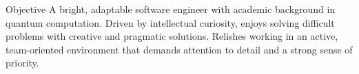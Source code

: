 \documentclass{resume} %
\begin{document}
%
\begin{rSection}{Objective}
A bright, adaptable software engineer with academic background in quantum computation. Driven by intellectual curiosity, enjoys solving difficult problems with creative and pragmatic solutions. Relishes working in an active, team-oriented environment that demands attention to detail and a strong sense of priority.
\end{rSection}

\end{document}
